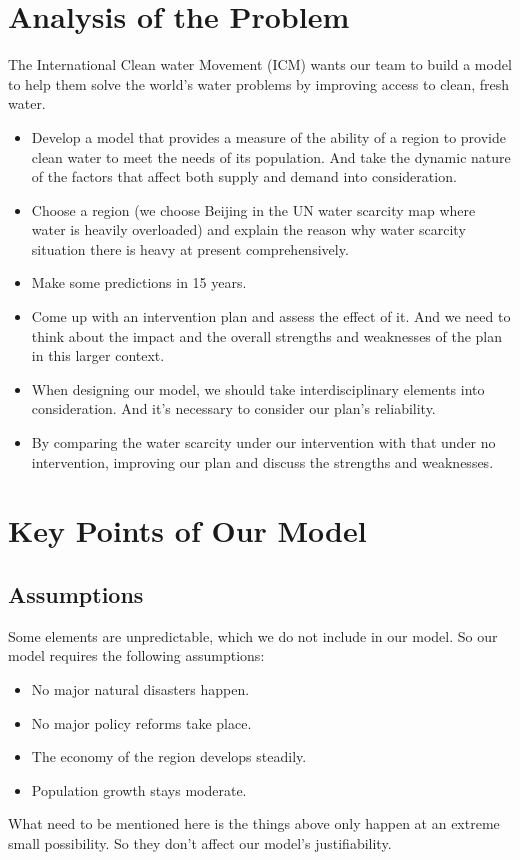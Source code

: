 \documentclass{mcmthesis}
\begin{document}
\section{Analysis of the Problem}
\par The International Clean water Movement (ICM) wants our team to build a model to help them solve the world’s water problems by improving access to clean, fresh water. 
\begin{itemize}
	\item Develop a model that provides a measure of the ability of a region to provide clean water to meet the needs of its population. And take the dynamic nature of the factors that affect both supply and demand into consideration.
	\item Choose a region (we choose Beijing in the UN water scarcity map where water is heavily overloaded) and explain the reason why water scarcity situation there is heavy at present comprehensively.
	\item Make some predictions in 15 years.
	\item Come up with an intervention plan and assess the effect of it. And we need to think about the impact and the overall strengths and weaknesses of the plan in this larger context.
	\item When designing our model, we should take interdisciplinary elements into consideration. And it’s necessary to consider our plan’s reliability.
	\item By comparing the water scarcity under our intervention with that under no intervention,  improving our plan and discuss the strengths and weaknesses.
\end{itemize}


\section{Key Points of Our Model}
\subsection{Assumptions}
\par Some elements are unpredictable, which we do not include in our model. So our model requires the following assumptions:
\begin{itemize}
	\item No major natural disasters happen.
	\item No major policy reforms take place.
	\item The economy of the region develops steadily.
	\item Population growth stays moderate.
\end{itemize}
\par What need to be mentioned here is the things above only happen at an extreme small possibility. So they don’t affect our model’s justifiability.
\end{document}
